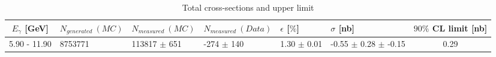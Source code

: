 \documentclass[8pt]{extarticle}
\begin{document}
 \begin{table}[!htbp]
 \begin{minipage}{\textwidth}
 \begin{center}
 \caption{Total cross-sections and upper limit}
 \begin{tabularx}{\textwidth}{|c|X|X|X|X|X|c|}
 \hline
 $E_{\gamma}$ [GeV] & $N_{generated}~(MC)$ & $N_{measured}~(MC)$ & $N_{measured}~(Data)$ & $\epsilon$ [$\%$] & $\sigma$ [nb] & $90\%$ CL limit [nb] \\ 
 \hline
5.90 - 11.90 & 8753771 & 113817 $\pm$ 651 & -274 $\pm$ 140 & 1.30 $\pm$ 0.01 & -0.55 $\pm$ 0.28 $\pm$ -0.15 & 0.29 \\ 
\hline
 \end{tabularx}
 \end{center}
 \end{minipage}
 \end{table}
 
\end{document}
